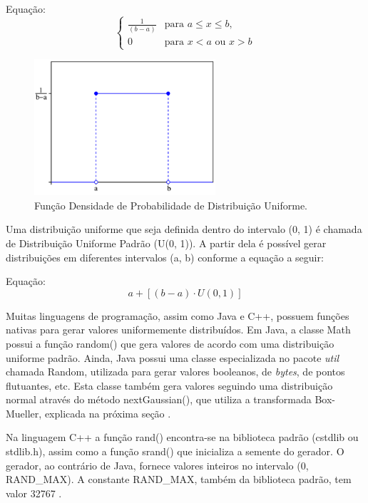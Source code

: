 Equação: \[\left\{\begin{matrix}
\frac{1}{(b-a)} & \mbox{para } a \leqslant x \leqslant b,\\ 
0 & \mbox{para } x < a \mbox{ ou } x > b
\end{matrix}\right.\]

\begin{figure}[!htb]
	\centering
	\includegraphics[width=0.6\textwidth]{./imgs/uniformdist.png}
	\caption{Função Densidade de Probabilidade de Distribuição Uniforme.}
	\label{fig:uniformdist}
\end{figure}

Uma distribuição uniforme que seja definida dentro do intervalo (0, 1) é chamada de Distribuição Uniforme Padrão (U(0, 1)). A partir dela é possível gerar distribuições em diferentes intervalos (a, b) conforme a equação a seguir:

Equação: \[a+[(b-a) \cdot U(0, 1)]\]

Muitas linguagens de programação, assim como Java e C++, possuem funções nativas para gerar valores uniformemente distribuídos. Em Java, a classe Math possui a função random() que gera valores de acordo com uma distribuição uniforme padrão. Ainda, Java possui uma classe especializada no pacote \emph{util} chamada Random, utilizada para gerar valores booleanos, de \emph{bytes}, de pontos flutuantes, etc. Esta classe também gera valores seguindo uma distribuição normal através do método nextGaussian(), que utiliza a transformada Box-Mueller, explicada na próxima seção \cite{javaapi}. 

Na linguagem C++ a função rand() encontra-se na biblioteca padrão (cstdlib ou stdlib.h), assim como a função srand() que inicializa a semente do gerador. O gerador, ao contrário de Java, fornece valores inteiros no intervalo (0, RAND\_MAX). A constante RAND\_MAX, também da biblioteca padrão, tem valor 32767 \cite{cppreference}.

